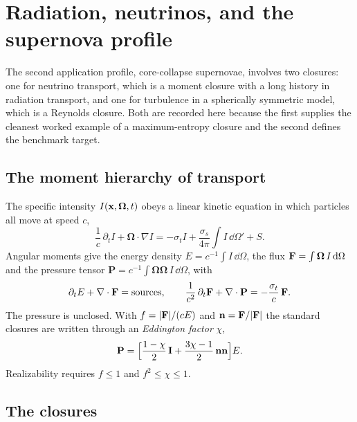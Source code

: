 \section{Radiation, neutrinos, and the supernova profile}
\label{sec:rad}

The second application profile, core-collapse supernovae, involves two
closures: one for neutrino transport, which is a moment closure with a long
history in radiation transport, and one for turbulence in a
spherically symmetric model, which is a Reynolds closure. Both are
recorded here because the first supplies the cleanest worked example of a
maximum-entropy closure and the second defines the benchmark target.

\subsection{The moment hierarchy of transport}

The specific intensity $I(\mathbf{x},\boldsymbol\Omega,t)$ obeys a linear kinetic
equation in which particles all move at speed $c$,
\[
  \frac1c\,\partial_tI+\boldsymbol\Omega\cdot\nabla I
  =-\sigma_tI+\frac{\sigma_s}{4\pi}\int I\,\dd\Omega'+S .
\]
Angular moments give the energy density $E=c^{-1}\int I\,\dd\Omega$, the
flux $\mathbf{F}=\int\boldsymbol\Omega\,I\,\mathrm{d}\Omega$ and the pressure tensor
$\mathbf P=c^{-1}\int\boldsymbol\Omega\boldsymbol\Omega\,I\,\dd\Omega$,
with
\begin{equation}
  \partial_tE+\nabla\cdot\mathbf{F}=\text{sources},\qquad
  \frac1{c^2}\,\partial_t\mathbf{F}+\nabla\cdot\mathbf P=-\frac{\sigma_t}{c}\,\mathbf{F} .
\end{equation}
The pressure is unclosed. With $f=|\mathbf{F}|/(cE)$ and
$\mathbf n=\mathbf{F}/|\mathbf{F}|$ the standard closures are written through an
\emph{Eddington factor} $\chi$,
\begin{equation}
  \mathbf P=\Bigl[\frac{1-\chi}{2}\,\mathbf I
     +\frac{3\chi-1}{2}\,\mathbf n\mathbf n\Bigr]E .
\end{equation}
Realizability requires $f\le1$ and $f^2\le\chi\le1$.

\subsection{The closures}

